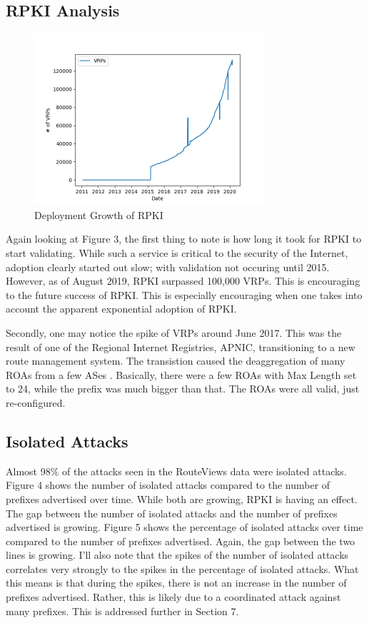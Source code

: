 \subsection{RPKI Analysis}
\begin{figure}
    \begin{center}
        \includegraphics[width=\textwidth, height=2.5in, keepaspectratio]{figures/rpki-deployment.png}
    \end{center}
    \caption{Deployment Growth of RPKI}
\end{figure}

Again looking at Figure 3, the first thing to note is how long it took for
RPKI to start validating. While such a service is critical to the security of
the Internet, adoption clearly started out slow; with validation not occuring
until 2015. However, as of August 2019, RPKI surpassed 100,000 VRPs. This is
encouraging to the future success of RPKI. This is especially encouraging when
one takes into account the apparent exponential adoption of RPKI.

Secondly, one may notice the spike of VRPs around June 2017. This was the result
of one of the Regional Internet Registries, APNIC, transitioning to a new route
management system. The transistion caused the deaggregation of many ROAs from a
few ASes \cite{apnic-ziggy}.  Basically, there were a few ROAs with Max Length
set to 24, while the prefix was much bigger than that. The ROAs were all valid,
just re-configured.

\subsection{Isolated Attacks}
Almost 98\% of the attacks seen in the RouteViews data were isolated attacks.
Figure 4 shows the number of isolated attacks compared to the number of prefixes
advertised over time. While both are growing, RPKI is having an effect. The gap
between the number of isolated attacks and the number of prefixes advertised is
growing. Figure 5 shows the percentage of isolated attacks over time compared to
the number of prefixes advertised. Again, the gap between the two lines is
growing. I'll also note that the spikes of the number of isolated attacks
correlates very strongly to the spikes in the percentage of isolated attacks.
What this means is that during the spikes, there is not an increase in the
number of prefixes advertised. Rather, this is likely due to a coordinated
attack against many prefixes. This is addressed further in Section 7.

